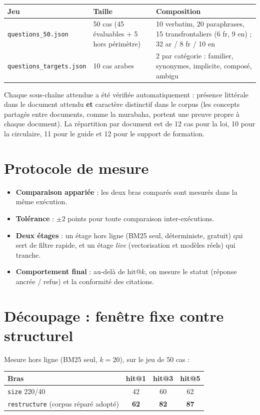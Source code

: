 \documentclass[a4paper,12pt]{report}
\begin{document}
\begin{table}[H]
\centering
\small
\begin{tabular}{p{3.6cm}p{3.0cm}p{7.9cm}}
\toprule
\textbf{Jeu} & \textbf{Taille} & \textbf{Composition} \\
\midrule
\texttt{questions\_50.json} & 50 cas (45 évaluables + 5 hors périmètre) & 10 verbatim,
20 paraphrases, 15 transfrontaliers (6 fr, 9 en) ; 32 ar / 8 fr / 10 en \\
\texttt{questions\_targets.json} & 10 cas arabes & 2 par catégorie : familier, synonymes,
implicite, composé, ambigu \\
\bottomrule
\end{tabular}
\end{table}

Chaque sous-chaîne attendue a été vérifiée automatiquement : présence littérale dans le document
attendu \textbf{et} caractère distinctif dans le corpus (les concepts partagés entre documents,
comme la murabaha, portent une preuve propre à chaque document). La répartition par document est de
12 cas pour la loi, 10 pour la circulaire, 11 pour le guide et 12 pour le support de formation.

\section{Protocole de mesure}
\begin{itemize}
  \item \textbf{Comparaison appariée} : les deux bras comparés sont mesurés dans la même exécution.
  \item \textbf{Tolérance} : $\pm 2$ points pour toute comparaison inter-exécutions.
  \item \textbf{Deux étages} : un étage hors ligne (BM25 seul, déterministe, gratuit) qui sert de
        filtre rapide, et un étage \emph{live} (vectorisation et modèles réels) qui tranche.
  \item \textbf{Comportement final} : au-delà de hit@$k$, on mesure le statut (réponse ancrée /
        refus) et la conformité des citations.
\end{itemize}

\section{Découpage : fenêtre fixe contre structurel}
Mesure hors ligne (BM25 seul, $k = 20$), sur le jeu de 50 cas :

\begin{table}[H]
\centering
\begin{tabular}{lccc}
\toprule
\textbf{Bras} & \textbf{hit@1} & \textbf{hit@3} & \textbf{hit@5} \\
\midrule
\texttt{size} 220/40 & 42 & 60 & 62 \\
\texttt{restructure} (corpus réparé adopté) & \textbf{62} & \textbf{82} & \textbf{87} \\
\bottomrule
\end{tabular}
\end{table}
\end{document}
